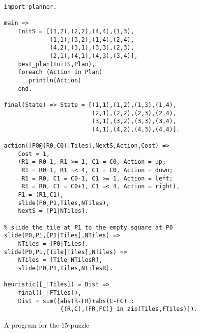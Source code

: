 \begin{figure}[t]
\begin{center}
\begin{verbatim}
import planner.

main =>
    InitS = [(1,2),(2,2),(4,4),(1,3),
             (1,1),(3,2),(1,4),(2,4),
             (4,2),(3,1),(3,3),(2,3),
             (2,1),(4,1),(4,3),(3,4)],
    best_plan(InitS,Plan),
    foreach (Action in Plan)
       println(Action)
    end.

final(State) => State = [(1,1),(1,2),(1,3),(1,4),
                         (2,1),(2,2),(2,3),(2,4),
                         (3,1),(3,2),(3,3),(3,4),
                         (4,1),(4,2),(4,3),(4,4)].

action([P0@(R0,C0)|Tiles],NextS,Action,Cost) =>
    Cost = 1,
    (R1 = R0-1, R1 >= 1, C1 = C0, Action = up;
     R1 = R0+1, R1 =< 4, C1 = C0, Action = down;
     R1 = R0, C1 = C0-1, C1 >= 1, Action = left;
     R1 = R0, C1 = C0+1, C1 =< 4, Action = right),
    P1 = (R1,C1),
    slide(P0,P1,Tiles,NTiles),
    NextS = [P1|NTiles].

% slide the tile at P1 to the empty square at P0
slide(P0,P1,[P1|Tiles],NTiles) =>
    NTiles = [P0|Tiles].
slide(P0,P1,[Tile|Tiles],NTiles) =>
    NTiles = [Tile|NTilesR],
    slide(P0,P1,Tiles,NTilesR).

heuristic([_|Tiles]) = Dist =>
    final([_|FTiles]),
    Dist = sum([abs(R-FR)+abs(C-FC) : 
                {(R,C),(FR,FC)} in zip(Tiles,FTiles)]).
\end{verbatim}
\end{center}
\caption{\label{fig:15puzzlesol}A program for the 15-puzzle}
\end{figure}



